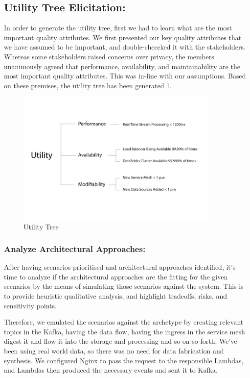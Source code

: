 \documentclass[review]{elsarticle}
\begin{document}
\subsection{Utility Tree Elicitation:}
In order to generate the utility tree, first we had to learn what are the most important quality attributes. We first presented our key quality attributes that we have assumed to be important, and double-checcked it with the stakeholders. Whereas some stakeholders raised concerns over privacy, the members unanimously agreed that performance, availability, and maintainability are the most important quality attributes. This was in-line with our assumptions. Based on these premises, the utility tree has been generated \ref{fig:utility-tree}.

\begin{figure}[h!]
    \centering
    \includegraphics[width=10cm]{Media/Utility-tree.jpg}
    \caption{Utility Tree}
    \label{fig:utility-tree}
\end{figure}

\subsubsection{Analyze Architectural Approaches:}

After having scenarios prioritised and architectural approaches identified, it's time to analyze if the architectural approaches are the fitting for the given scenarios by the means of simulating those scenarios against the system. This is to provide heuristic qualitative analysis, and highlight tradeoffs, risks, and sensitivity points.  

Therefore, we emulated the scenarios against the archetype by creating relevant topics in the Kafka, having the data flow, having the ingress in the service mesh digest it and flow it into the storage and processing and so on so forth. We've been using real world data, so there was no need for data fabrication and synthesis.  We configured Nginx to pass the request to the responsible Lambdas, and Lambdas then produced the necessary events and sent it to Kafka. 
\end{document}
